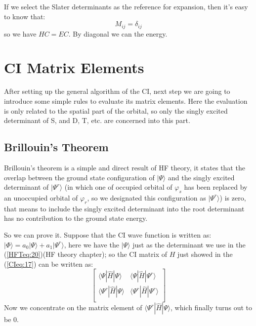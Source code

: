 If we select the Slater determinants as the reference for expansion, then it's
easy to know that:
\begin{equation}
 M_{ij} = \delta_{ij} 
\end{equation}
so we have $HC=EC$. By diagonal we can the energy.

\section{CI Matrix Elements}
After setting up the general algorithm of the CI, next step we are
going to introduce some simple rules to evaluate its matrix
elements. Here the evaluation is only related to the spatial part of
the orbital, so only the singly excited determinant of S, and D, T,
etc. are concerned into this part.

\subsection{Brillouin's Theorem}
%
%
Brillouin's theorem is a simple and direct result of HF theory, it
states that the overlap between the ground state configuration of
$|\Psi \rangle$ and the singly excited determinant of $|\Psi^{r}
\rangle$ (in which one of occupied orbital of $\varphi_{s}$ has been
replaced by an unoccupied orbital of $\varphi_{r}$, so we designated
this configuration as $|\Psi^{r} \rangle$) is zero, that means to
include the singly excited determinant into the root determinant has
no contribution to the ground state energy.

So we can prove it. Suppose that the CI wave function is written as:
$|\Phi \rangle= a_{0}|\Psi \rangle+ a_{1}|\Psi^{r}\rangle$, here we
have the $|\Psi \rangle$ just as the determinant we use in the
(\ref{HFTeq:20})(HF theory chapter); so the CI matrix of $H$ just
showed in the (\ref{CIeq:17}) can be written as:
\begin{equation}\label{CIeq:19}
  \left[
    \begin{array}{cc}
      \langle \Psi|\hat{H}|\Psi     \rangle       &   \langle \Psi|\hat{H}|\Psi^{r}     \rangle     \\
      \langle \Psi^{r}|\hat{H}|\Psi \rangle       &   \langle \Psi^{r}|\hat{H}|\Psi^{r} \rangle     \\
    \end{array}
  \right]
\end{equation}
Now we concentrate on the matrix element of $\langle
\Psi^{r}|\hat{H}|\Psi\rangle$, which finally turns out to be 0.

